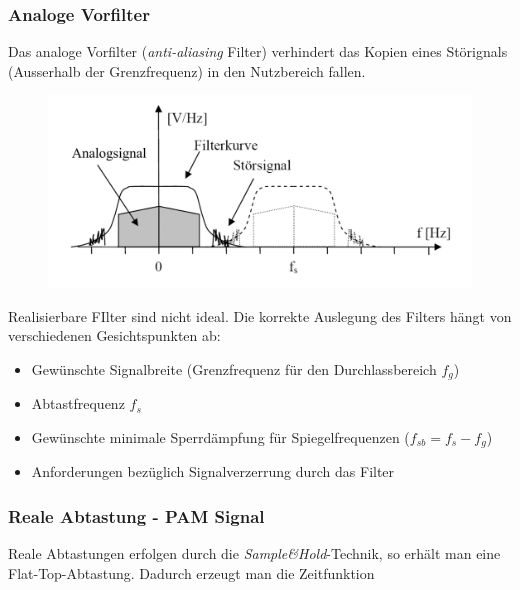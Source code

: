 \documentclass[
  10pt,
  a4paper,
  german]{article}
\numberwithin{equation}{section}
\begin{document}
\hypertarget{analoge-vorfilter}{%
\subsubsection{Analoge Vorfilter}\label{analoge-vorfilter}}

Das analoge Vorfilter (\emph{anti-aliasing} Filter) verhindert das
Kopien eines Störignals (Ausserhalb der Grenzfrequenz) in den
Nutzbereich fallen.

\begin{figure}[H]

{\centering \includegraphics{images/02_AntiAliasing.png}

}

\end{figure}

Realisierbare FIlter sind nicht ideal. Die korrekte Auslegung des
Filters hängt von verschiedenen Gesichtspunkten ab:

\begin{itemize}
\item
  Gewünschte Signalbreite (Grenzfrequenz für den Durchlassbereich
  \(f_g\))
\item
  Abtastfrequenz \(f_s\)
\item
  Gewünschte minimale Sperrdämpfung für Spiegelfrequenzen
  (\(f_{sb}=f_s-f_g\))
\item
  Anforderungen bezüglich Signalverzerrung durch das Filter
\end{itemize}

\hypertarget{reale-abtastung---pam-signal}{%
\subsubsection{Reale Abtastung - PAM
Signal}\label{reale-abtastung---pam-signal}}

Reale Abtastungen erfolgen durch die \emph{Sample\&Hold}-Technik, so
erhält man eine Flat-Top-Abtastung. Dadurch erzeugt man die Zeitfunktion
\end{document}
